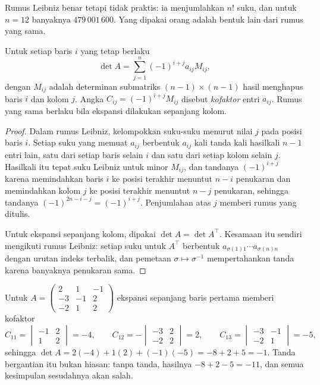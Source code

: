 Rumus Leibniz benar tetapi tidak praktis: ia menjumlahkan $n!$ suku, dan untuk $n=12$
banyaknya $479\,001\,600$. Yang dipakai orang adalah bentuk lain dari rumus yang sama.

\begin{akibat}
Untuk setiap baris $i$ yang tetap berlaku
\[
  \det A=\sum_{j=1}^{n}(-1)^{i+j}a_{ij}M_{ij},
\]
dengan $M_{ij}$ adalah determinan submatriks $(n-1)\times(n-1)$ hasil menghapus baris $i$
dan kolom $j$. Angka $C_{ij}=(-1)^{i+j}M_{ij}$ disebut \emph{kofaktor} entri $a_{ij}$.
Rumus yang sama berlaku bila ekspansi dilakukan sepanjang kolom.
\end{akibat}

\begin{proof}
Dalam rumus Leibniz, kelompokkan suku-suku menurut nilai $j$ pada posisi baris $i$. Setiap
suku yang memuat $a_{ij}$ berbentuk $a_{ij}$ kali tanda kali hasilkali $n-1$ entri lain,
satu dari setiap baris selain $i$ dan satu dari setiap kolom selain $j$. Hasilkali itu tepat
suku Leibniz untuk minor $M_{ij}$, dan tandanya $(-1)^{i+j}$ karena memindahkan baris $i$
ke posisi terakhir menuntut $n-i$ penukaran dan memindahkan kolom $j$ ke posisi terakhir
menuntut $n-j$ penukaran, sehingga tandanya $(-1)^{2n-i-j}=(-1)^{i+j}$. Penjumlahan atas
$j$ memberi rumus yang ditulis.

Untuk ekspansi sepanjang kolom, dipakai $\det A=\det A^{\top}$. Kesamaan itu sendiri
mengikuti rumus Leibniz: setiap suku untuk $A^{\top}$ berbentuk
$a_{\sigma(1)1}\cdots a_{\sigma(n)n}$ dengan urutan indeks terbalik, dan pemetaan
$\sigma\mapsto\sigma^{-1}$ mempertahankan tanda karena banyaknya penukaran sama.
\end{proof}

\begin{contoh}
Untuk
$A=\begin{pmatrix}2&1&-1\\ -3&-1&2\\ -2&1&2\end{pmatrix}$ ekspansi sepanjang baris pertama
memberi kofaktor
\[
  C_{11}=\begin{vmatrix}-1&2\\ 1&2\end{vmatrix}=-4,\qquad
  C_{12}=-\begin{vmatrix}-3&2\\ -2&2\end{vmatrix}=2,\qquad
  C_{13}=\begin{vmatrix}-3&-1\\ -2&1\end{vmatrix}=-5,
\]
sehingga $\det A=2(-4)+1(2)+(-1)(-5)=-8+2+5=-1$. Tanda bergantian itu bukan hiasan: tanpa
tanda, hasilnya $-8+2-5=-11$, dan semua kesimpulan sesudahnya akan salah.
\end{contoh}

